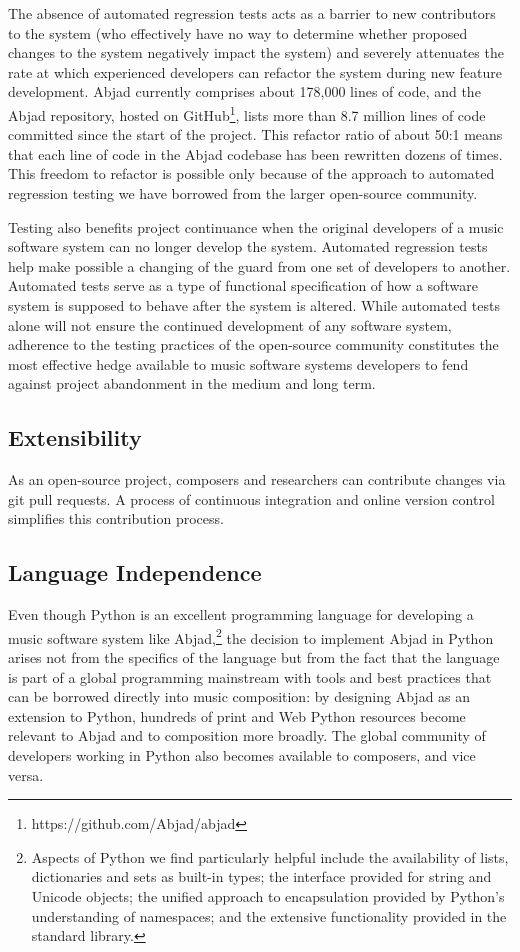 \documentclass{article}
\begin{document}
The absence of automated regression tests acts as a barrier to new contributors
to the system (who effectively have no way to determine whether proposed
changes to the system negatively impact the system) and severely attenuates the
rate at which experienced developers can refactor the system during new feature
development. Abjad currently comprises about 178,000 lines of code, and the
Abjad repository, hosted on GitHub\footnote{https://github.com/Abjad/abjad},
lists more than 8.7 million lines of code committed since the start of the
project. This refactor ratio of about 50:1 means that each line of code in the
Abjad codebase has been rewritten dozens of times. This freedom to refactor is
possible only because of the approach to automated regression testing we have
borrowed from the larger open-source community.

Testing also benefits project continuance when the original developers of a
music software system can no longer develop the system. Automated regression
tests help make possible a changing of the guard from one set of developers to
another. Automated tests serve as a type of functional specification of how a
software system is supposed to behave after the system is altered. While
automated tests alone will not ensure the continued development of any software
system, adherence to the testing practices of the open-source community
constitutes the most effective hedge available to music software systems
developers to fend against project abandonment in the medium and long term.

\subsection{Extensibility}

As an open-source project, composers and researchers can contribute changes via
git pull requests. A process of continuous integration and online version
control simplifies this contribution process.

\subsection{Language Independence}

Even though Python is an excellent programming language for developing a music
software system like Abjad,\footnote{Aspects of Python we find particularly
helpful include the availability of lists, dictionaries and sets as built-in
types; the interface provided for string and Unicode objects; the unified
approach to encapsulation provided by Python's understanding of namespaces; and
the extensive functionality provided in the standard library.} the decision to
implement Abjad in Python arises not from the specifics of the language but
from the fact that the language is part of a global programming mainstream with
tools and best practices that can be borrowed directly into music composition:
by designing Abjad as an extension to Python, hundreds of print and Web Python
resources become relevant to Abjad and to composition more broadly. The global
community of developers working in Python also becomes available to composers,
and vice versa.
\end{document}
